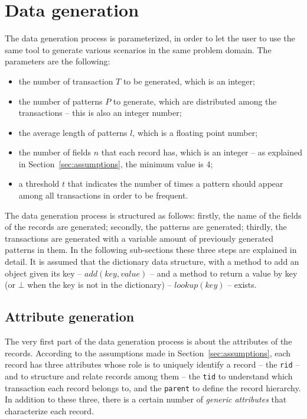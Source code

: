\documentclass{acm_proc_article-sp-sigmod09}
\begin{document}
\section{Data generation}
\label{sec:generation}
The data generation process is parameterized, in order to let the user to use the same tool to generate various scenarios in the same problem domain. The parameters are the following:
\begin{itemize}
\item the number of transaction $T$ to be generated, which is an integer;
\item the number of patterns $P$ to generate, which are distributed among the transactions -- this is also an integer number;
\item the average length of patterns $l$, which is a floating point number;
\item the number of fields $n$ that each record has, which is an integer -- as explained in Section~\ref{sec:assumptions}, the minimum value is 4;
\item a threshold $t$ that indicates the number of times a pattern should appear among all transactions in order to be frequent.
\end{itemize} 
The data generation process is structured as follows: firstly, the name of the fields of the records are generated; secondly, the patterns are generated; thirdly, the transactions are generated with a variable amount of previously generated patterns in them. In the following sub-sections these three steps are explained in detail. It is assumed that the dictionary data structure, with a method to add an object given its key -- $add(key, value)$ -- and a method to return a value by key (or $\bot$ when the key is not in the dictionary) -- $lookup(key)$ -- exists.

\subsection{Attribute generation}
The very first part of the data generation process is about the attributes of the records. According to the assumptions made in Section~\ref{sec:assumptions}, each record has three attributes whose role is to uniquely identify a record -- the \texttt{rid} -- and to structure and relate records among them -- the \texttt{tid} to understand which transaction each record belongs to, and the \texttt{parent} to define the record hierarchy. In addition to these three, there is a certain number of \emph{generic attributes} that characterize each record.
\end{document}
